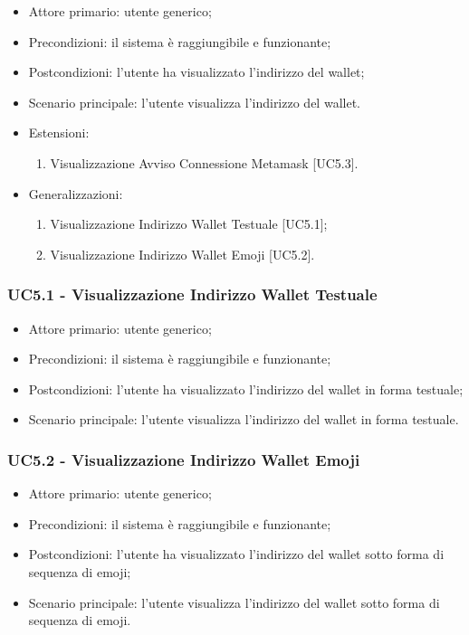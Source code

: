 \begin{itemize}
    \item Attore primario: utente generico;
    \item Precondizioni: il sistema è raggiungibile e funzionante;
    \item Postcondizioni: l'utente ha visualizzato l'indirizzo del wallet\glo{};
    \item Scenario principale: l'utente visualizza l'indirizzo del wallet\glo{}.
    \item Estensioni:
    \begin{enumerate}
        \item Visualizzazione Avviso Connessione Metamask\glo{} [UC5.3].
    \end{enumerate}
    \item Generalizzazioni:
    \begin{enumerate}
        \item Visualizzazione Indirizzo Wallet\glo{} Testuale [UC5.1];
        \item Visualizzazione Indirizzo Wallet\glo{} Emoji [UC5.2].
    \end{enumerate}
\end{itemize}

\subsubsection{UC5.1 - Visualizzazione Indirizzo Wallet Testuale}

\begin{itemize}
    \item Attore primario: utente generico;
    \item Precondizioni: il sistema è raggiungibile e funzionante;
    \item Postcondizioni: l'utente ha visualizzato l'indirizzo del wallet\glo{} in forma testuale;
    \item Scenario principale: l'utente visualizza l'indirizzo del wallet\glo{} in forma testuale.
\end{itemize}

\subsubsection{UC5.2 - Visualizzazione Indirizzo Wallet Emoji}

\begin{itemize}
    \item Attore primario: utente generico;
    \item Precondizioni: il sistema è raggiungibile e funzionante;
    \item Postcondizioni: l'utente ha visualizzato l'indirizzo del wallet sotto forma di sequenza di emoji;
    \item Scenario principale: l'utente visualizza l'indirizzo del wallet sotto forma di sequenza di emoji.
\end{itemize}

